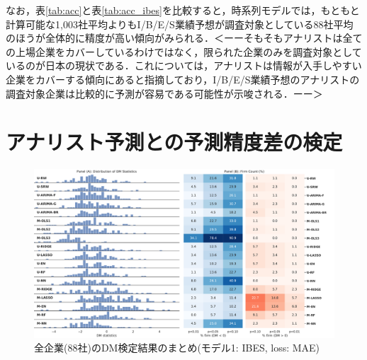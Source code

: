\documentclass[a4paper，12pt]{jsarticle}
\begin{document}

なお，表\ref{tab:acc}と表\ref{tab:acc_ibes}を比較すると，時系列モデルでは，もともと計算可能な1,003社平均よりもI/B/E/S業績予想が調査対象としている88社平均のほうが全体的に精度が高い傾向がみられる．＜ーーそもそもアナリストは全ての上場企業をカバーしているわけではなく，限られた企業のみを調査対象としているのが日本の現状である．これについて\cite{nakai2006}は，アナリストは情報が入手しやすい企業をカバーする傾向にあると指摘しており，I/B/E/S業績予想のアナリストの調査対象企業は比較的に予測が容易である可能性が示唆される．ーー＞

\section{アナリスト予測との予測精度差の検定}

\begin{figure}
  \centering
  \caption{全企業(88社)のDM検定結果のまとめ(モデル1: IBES, loss: MAE)}
  \label{fig:dm_ibes_mad}
  \includegraphics[width=15cm]{./img/_dm_MAD_y_hat_ibes.pdf}
\end{figure}
\end{document}
